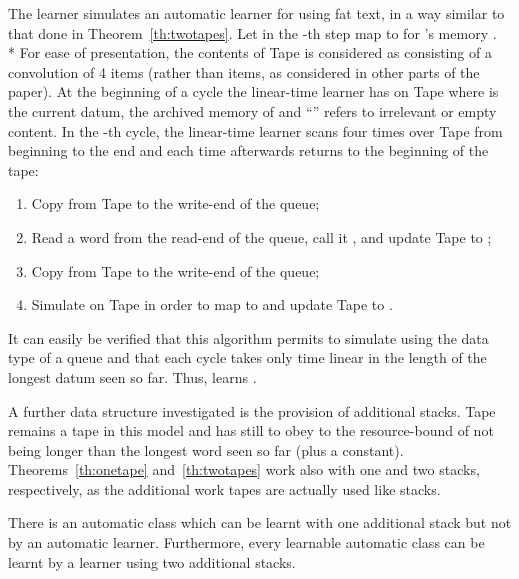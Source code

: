 \documentclass{LMCS}
\theoremstyle{plain}\newtheorem{athm}[thm]{Theorem}
\theoremstyle{plain}\newtheorem{aprop}[thm]{Proposition}
\theoremstyle{plain}\newtheorem{aprob}[thm]{Open Problem}
\theoremstyle{plain}\newtheorem{acor}[thm]{Corollary}
\theoremstyle{plain}\newtheorem{alem}[thm]{Lemma}
\theoremstyle{definition}\newtheorem{adefn}[thm]{Definition}
\theoremstyle{definition}\newtheorem{arem}[thm]{Remark}
\theoremstyle{plain}\newtheorem{aexmp}[thm]{Example}
\theoremstyle{plain}\newtheorem{aclm}[thm]{Claim}
\def\niceqed{~~}
\def\sp{\\*\indent}
\begin{document}
\proof
The learner simulates an automatic learner  for 
using fat text, in a way similar
to that done in Theorem~\ref{th:twotapes}. Let  in the -th step map
 to  for 's memory . 
\sp
For ease of presentation, the contents of Tape  is considered as
consisting of a convolution of 4 items (rather than  items,
as considered in other parts of the paper).
At the beginning of a cycle the linear-time learner  has 
 on Tape 
where  is the current datum,  the archived memory of  and
``'' refers to irrelevant or empty content. In the -th cycle,
the linear-time learner  
scans four times over Tape  from beginning to the end
and each time afterwards returns to the beginning of the tape:
\begin{enumerate}[(1)]
\item Copy  from Tape  to the write-end of the queue;
\item Read a word from the read-end of the queue, call it ,
      and update Tape  to ;
\item Copy  from Tape  to the write-end of the queue;
\item Simulate  on Tape  in order to map  to
       and update Tape  to .
\end{enumerate}
It can easily be verified that this algorithm permits to simulate 
using the data type of a queue and that each cycle takes only time
linear in the length of the longest datum seen so far.
Thus,  learns . \niceqed

\medskip
\noindent
A further data structure investigated is the provision of
additional stacks. Tape  remains a tape in this model and has
still to obey to the resource-bound of not being longer than the longest
word seen so far (plus a constant). Theorems~\ref{th:onetape}
and~\ref{th:twotapes} work
also with one and two stacks, respectively, as the additional work tapes
are actually used like stacks.

\begin{thm}
There is an automatic class which can be learnt
with one additional stack but not by an automatic learner. Furthermore,
every learnable automatic class can be learnt by a learner
using two additional stacks.
\end{thm}
\end{document}
